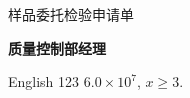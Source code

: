 \documentclass[UTF8,fontset=fandol]{ctexart}
\begin{document}
\noindent 样品委托检验申请单

\textbf{质量控制部经理}

English 123 $6.0\times10^7$, $x\geq 3$.
\end{document}

